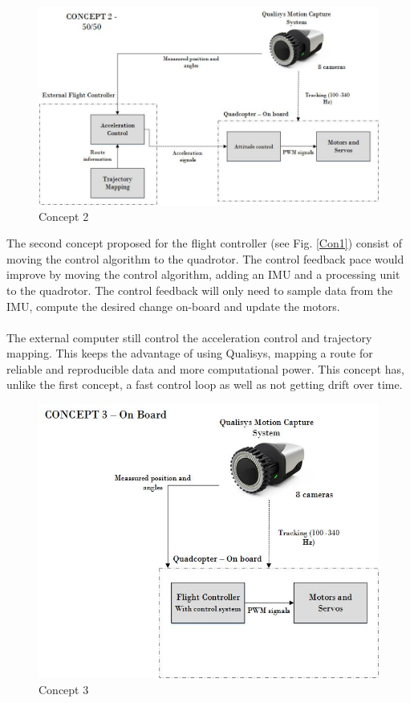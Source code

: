 \begin{figure}[H]
          \centering
            \includegraphics[scale = 0.67]{VAPIQ-PICTURES/Concept2.jpg}
                \caption{Concept 2}
                \label{Con1}
            \label{dir}
\end{figure} 
\newpage
\noindent
The second concept proposed for the flight controller (see Fig. \ref{Con1}) consist of moving the control algorithm to the quadrotor. The control feedback pace would improve by moving the control algorithm, adding an IMU and a processing unit to the quadrotor. The control feedback will only need to sample data from the IMU, compute the desired change on-board and update the motors. 
\\\\
The external computer still control the acceleration control and trajectory mapping. This keeps the advantage of using Qualisys, mapping a route for reliable and reproducible data and more computational power. This concept has, unlike the first concept, a fast control loop as well as not getting drift over time. 
\begin{figure}[H]
          \centering
            \includegraphics[scale = 0.67]{VAPIQ-PICTURES/Concept3.jpg}
                \caption{Concept 3}
                \label{Con2}
            \label{dir}
\end{figure} 
